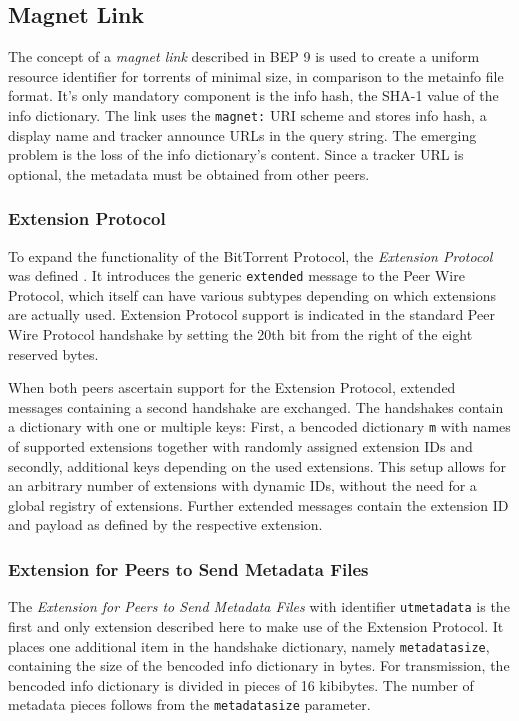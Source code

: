 \documentclass[10pt, a4paper]{scrartcl} %
\renewcommand{\_}{\origunderscore\allowbreak}
\begin{document}
\subsection{Magnet Link}
The concept of a \emph{magnet link} described in BEP 9 \cite{bep9} is used to create a uniform resource identifier for torrents of minimal size, in comparison to the metainfo file format. It's only mandatory component is the info hash, the SHA-1 value of the info dictionary. The link uses the \texttt{magnet:} URI scheme and stores info hash, a display name and tracker announce URLs in the query string. The emerging problem is the loss of the info dictionary's content. Since a tracker URL is optional, the metadata must be obtained from other peers.

\subsubsection{Extension Protocol}
To expand the functionality of the BitTorrent Protocol, the \emph{Extension Protocol} was defined \cite{bep10}. It introduces the generic \texttt{extended} message to the Peer Wire Protocol, which itself can have various subtypes depending on which extensions are actually used. Extension Protocol support is indicated in the standard Peer Wire Protocol handshake by setting the 20th bit from the right of the eight reserved bytes.

When both peers ascertain support for the Extension Protocol, extended messages containing a second handshake are exchanged. The handshakes contain a dictionary with one or multiple keys: First, a bencoded dictionary \texttt{m} with names of supported extensions together with randomly assigned extension IDs and secondly, additional keys depending on the used extensions. This setup allows for an arbitrary number of extensions with dynamic IDs, without the need for a global registry of extensions. Further extended messages contain the extension ID and payload as defined by the respective extension.

\subsubsection{Extension for Peers to Send Metadata Files}
The \emph{Extension for Peers to Send Metadata Files} \cite{bep9} with identifier \texttt{ut\_metadata} is the first and only extension described here to make use of the Extension Protocol. It places one additional item in the handshake dictionary, namely \texttt{metadata\_size}, containing the size of the bencoded info dictionary in bytes. For transmission, the bencoded info dictionary is divided in pieces of 16 kibibytes. The number of metadata pieces follows from the \texttt{metadata\_size} parameter.
\end{document}
